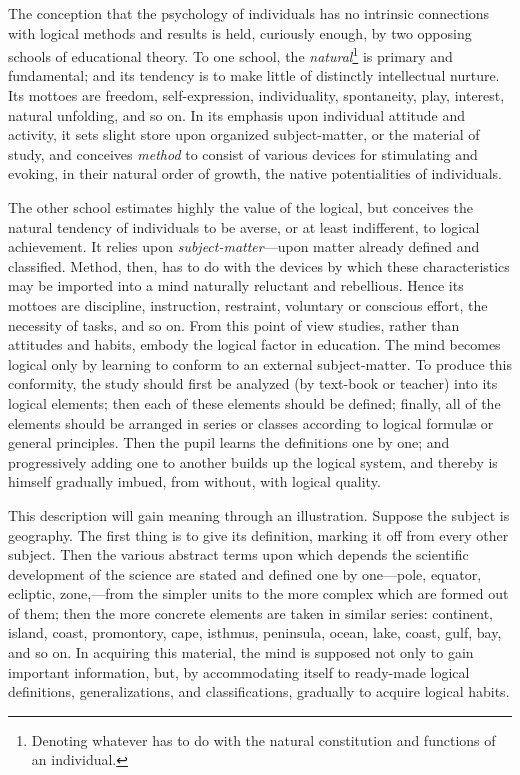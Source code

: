\documentclass[showtrims,ustradepaper]{memoir}
\begin{document}

The conception that the psychology of individuals has no intrinsic
connections with logical methods and results is held, curiously enough,
by two opposing schools of educational theory. To one school, the
\emph{natural}\footnote{
Denoting whatever has to do with the natural constitution and functions
of an individual.
}
is primary and fundamental; and its tendency is to make little of
distinctly intellectual nurture. Its mottoes are freedom,
self-expression, individuality, spontaneity, play, interest, natural
unfolding, and so on. In its emphasis upon individual attitude and
activity, it sets slight store upon organized subject-matter, or the
material of study, and conceives \emph{method} to consist of various
devices for stimulating and evoking, in their natural order of growth,
the native potentialities of individuals.



The other school estimates highly the value of the logical, but
conceives the natural tendency of individuals to be averse, or at least
indifferent, to logical achievement. It relies upon
\emph{subject-matter}---upon matter already defined and classified.
Method, then, has to do with the devices by which these characteristics
may be imported into a mind naturally reluctant and
rebellious.
Hence its mottoes are discipline, instruction, restraint, voluntary or
conscious effort, the necessity of tasks, and so on. From this point of
view studies, rather than attitudes and habits, embody the logical
factor in education. The mind becomes logical only by learning to
conform to an external subject-matter. To produce this conformity, the
study should first be analyzed (by text-book or teacher) into its
logical elements; then each of these elements should be defined;
finally, all of the elements should be arranged in series or classes
according to logical formulæ or general principles. Then the pupil
learns the definitions one by one; and progressively adding one to
another builds up the logical system, and thereby is himself gradually
imbued, from without, with logical quality.


This description will gain meaning through an illustration. Suppose the
subject is geography. The first thing is to give its definition, marking
it off from every other subject. Then the various abstract terms upon
which depends the scientific development of the science are stated and
defined one by one---pole, equator, ecliptic, zone,---from the simpler
units to the more complex which are formed out of them; then the more
concrete elements are taken in similar series: continent, island, coast,
promontory, cape, isthmus, peninsula, ocean, lake, coast, gulf, bay, and
so on. In acquiring this material, the mind is supposed not only to gain
important information, but, by accommodating itself to ready-made
logical definitions, generalizations, and classifications, gradually to
acquire logical habits.
\end{document}
